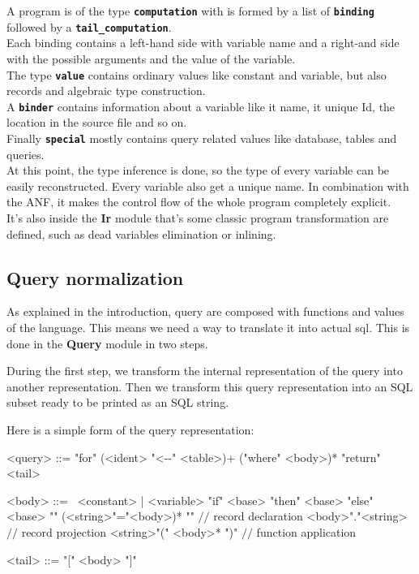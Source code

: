 \documentclass[11pt]{article}
\newcommand\mysc[1]{{\rmfamily\textsc{#1}}\xspace}
\newcommand\sql{\mysc{SQL}}
\newcommand\sig[1]{{\tt\bf #1}}
\newcommand\module[1]{{\bf #1}}
\renewcommand\comment[1]{{\color{gray} $//$ #1}}
\begin{document}
A program is of the type \sig{computation} with is formed by a list of \sig{binding} followed by a \sig{tail\_computation}.\\
Each binding contains a left-hand side with variable name and a right-and side with the possible arguments and the value of the variable. \\
The type \sig{value} contains ordinary values like constant and variable, but also records and algebraic type construction.\\
A \sig{binder} contains information about a variable like it name, it unique Id, the location in the source file and so on.\\
Finally \sig{special} mostly contains query related values like database, tables and queries.\\

At this point, the type inference is done, so the type of every variable can be easily reconstructed. Every variable also get a unique name. In combination with the ANF, it makes the control flow of the whole program completely explicit.\\

It's also inside the \module{Ir} module that's some classic program transformation are defined, such as dead variables elimination or inlining.

\subsection{Query normalization \label{querynorm}}

As explained in the introduction, query are composed with functions and values of the language. This means we need a way to translate it into actual sql. This is done in the \module{Query} module in two steps.

During the first step, we transform the internal representation of the query into another representation. Then we transform this query representation into an \sql subset ready to be printed as an \sql string.

Here is a simple form of the query representation:

\begin{grammar}
<query> ::= "for" (<ident> "<-\--" <table>)+ ("where" <body>)* "return" <tail>

<body> ::= \ 
\alt <constant> | <variable>
\alt "if" <base> "then" <base> "else" <base>
\alt "{" (<string>"="<body>)* "}" \comment{record declaration}
\alt <body>"."<string> \comment{record projection}
\alt <string>"(" <body>* ")" \comment{function application}

<tail> ::= "[" <body> "]"
\end{grammar}
\end{document}
